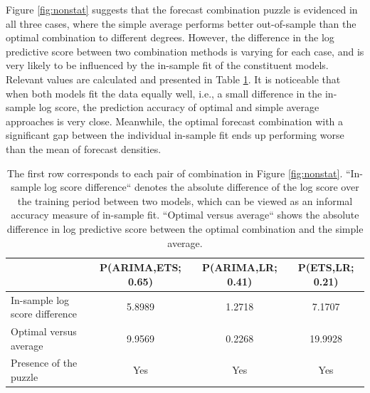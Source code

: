 \documentclass{monashthesis}
\begin{document}
Figure \ref{fig:nonstat} suggests that the forecast combination puzzle is evidenced in all three cases, where the simple average performs better out-of-sample than the optimal combination to different degrees. However, the difference in the log predictive score between two combination methods is varying for each case, and is very likely to be influenced by the in-sample fit of the constituent models. Relevant values are calculated and presented in Table \ref{tab:comparison1}. It is noticeable that when both models fit the data equally well, i.e., a small difference in the in-sample log score, the prediction accuracy of optimal and simple average approaches is very close. Meanwhile, the optimal forecast combination with a significant gap between the individual in-sample fit ends up performing worse than the mean of forecast densities.

\begin{table}[ht]
  \centering
    \begin{tabular}{l|ccc}
    \toprule
                                      &    P(ARIMA,ETS; 0.65)     &   P(ARIMA,LR; 0.41)    &    P(ETS,LR; 0.21)   \\
    \midrule
    In-sample log score difference    &   5.8989    &   1.2718    &   7.1707   \\
    Optimal versus average            &   9.9569    &   0.2268    &  19.9928   \\
    Presence of the puzzle            &   Yes       &   Yes       &   Yes      \\
    \bottomrule
    \end{tabular}
  \caption{The first row corresponds to each pair of combination in Figure \ref{fig:nonstat}. ``In-sample log score difference`` denotes the absolute difference of the log score over the training period between two models, which can be viewed as an informal accuracy measure of in-sample fit. ``Optimal versus average`` shows the absolute difference in log predictive score between the optimal combination and the simple average.}
  \label{tab:comparison1}
\end{table}
\end{document}
